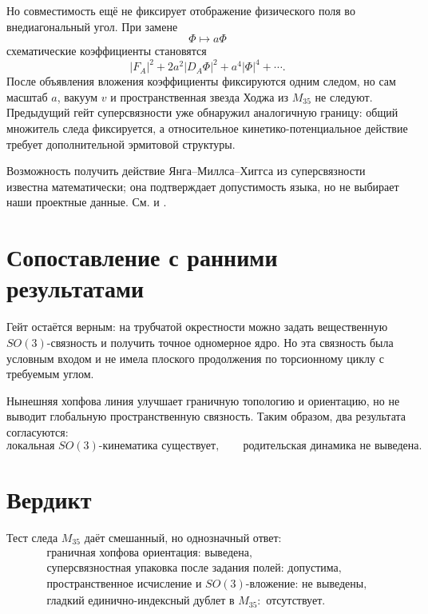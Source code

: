Но совместимость ещё не фиксирует отображение физического поля во
внедиагональный угол. При замене
\begin{equation}
 \Phi\longmapsto a\Phi
\end{equation}
схематические коэффициенты становятся
\begin{equation}
 |F_A|^2+2a^2|D_A\Phi|^2+a^4|\Phi|^4+\cdots.
 \label{eq:v5-superconnection-rescaling}
\end{equation}
После объявления вложения коэффициенты фиксируются одним следом, но сам
масштаб $a$, вакуум $v$ и пространственная звезда Ходжа из $M_{35}$ не
следуют. Предыдущий гейт суперсвязности уже обнаружил аналогичную границу:
общий множитель следа фиксируется, а относительное кинетико-потенциальное
действие требует дополнительной эрмитовой структуры.

Возможность получить действие Янга--Миллса--Хиггса из суперсвязности
известна математически; она подтверждает допустимость языка, но не выбирает
наши проектные данные. См.
 и
.

\section{Сопоставление с ранними результатами}

Гейт  остаётся верным: на
трубчатой окрестности можно задать вещественную $SO(3)$-связность и
получить точное одномерное ядро. Но эта связность была условным входом и
не имела плоского продолжения по торсионному циклу с требуемым углом.

Нынешняя хопфова линия улучшает граничную топологию и ориентацию, но не
выводит глобальную пространственную связность. Таким образом, два
результата согласуются:
\begin{equation}
 \text{локальная }SO(3)\text{-кинематика существует},
 \qquad
 \text{родительская динамика не выведена}.
\end{equation}

\section{Вердикт}

Тест следа $M_{35}$ даёт смешанный, но однозначный ответ:
\begin{equation}
 \boxed{
 \begin{gathered}
 \text{граничная хопфова ориентация: выведена},\\
 \text{суперсвязностная упаковка после задания полей: допустима},\\
 \text{пространственное исчисление и }SO(3)\text{-вложение: не выведены},\\
 \text{гладкий единично-индексный дублет в }M_{35}:\text{ отсутствует}.
 \end{gathered}}
\end{equation}

